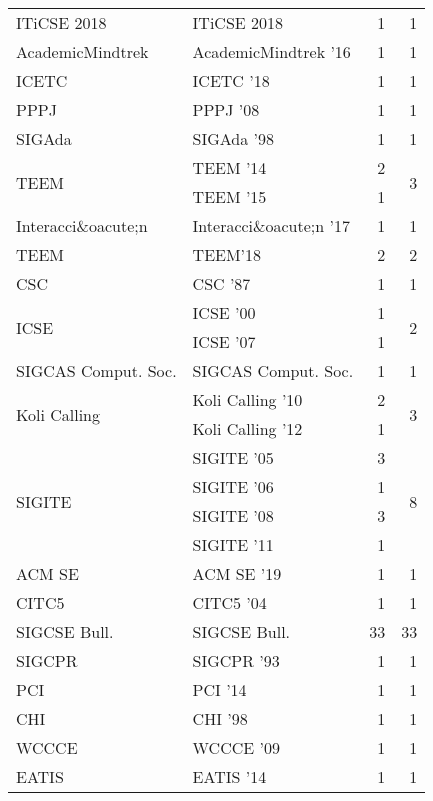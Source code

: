 \begin{table*}[t]
\begin{tabular}{llrr}
\multirow{1}{*}{ITiCSE 2018} & ITiCSE 2018 & 1 & \multirow{1}{*}{1}\\
\multirow{1}{*}{AcademicMindtrek } & AcademicMindtrek '16 & 1 & \multirow{1}{*}{1}\\
\multirow{1}{*}{ICETC } & ICETC '18 & 1 & \multirow{1}{*}{1}\\
\multirow{1}{*}{PPPJ } & PPPJ '08 & 1 & \multirow{1}{*}{1}\\
\multirow{1}{*}{SIGAda } & SIGAda '98 & 1 & \multirow{1}{*}{1}\\
\multirow{2}{*}{TEEM } & TEEM '14 & 2 & \multirow{2}{*}{3}\\
& TEEM '15 & 1 &\\
\multirow{1}{*}{Interacci\&oacute;n } & Interacci\&oacute;n '17 & 1 & \multirow{1}{*}{1}\\
\multirow{1}{*}{TEEM} & TEEM'18 & 2 & \multirow{1}{*}{2}\\
\multirow{1}{*}{CSC } & CSC '87 & 1 & \multirow{1}{*}{1}\\
\multirow{2}{*}{ICSE } & ICSE '00 & 1 & \multirow{2}{*}{2}\\
& ICSE '07 & 1 &\\
\multirow{1}{*}{SIGCAS Comput. Soc.} & SIGCAS Comput. Soc. & 1 & \multirow{1}{*}{1}\\
\multirow{2}{*}{Koli Calling } & Koli Calling '10 & 2 & \multirow{2}{*}{3}\\
& Koli Calling '12 & 1 &\\
\multirow{4}{*}{SIGITE } & SIGITE '05 & 3 & \multirow{4}{*}{8}\\
& SIGITE '06 & 1 &\\
& SIGITE '08 & 3 &\\
& SIGITE '11 & 1 &\\
\multirow{1}{*}{ACM SE } & ACM SE '19 & 1 & \multirow{1}{*}{1}\\
\multirow{1}{*}{CITC5 } & CITC5 '04 & 1 & \multirow{1}{*}{1}\\
\multirow{1}{*}{SIGCSE Bull.} & SIGCSE Bull. & 33 & \multirow{1}{*}{33}\\
\multirow{1}{*}{SIGCPR } & SIGCPR '93 & 1 & \multirow{1}{*}{1}\\
\multirow{1}{*}{PCI } & PCI '14 & 1 & \multirow{1}{*}{1}\\
\multirow{1}{*}{CHI } & CHI '98 & 1 & \multirow{1}{*}{1}\\
\multirow{1}{*}{WCCCE } & WCCCE '09 & 1 & \multirow{1}{*}{1}\\
\multirow{1}{*}{EATIS } & EATIS '14 & 1 & \multirow{1}{*}{1}\\

\end{tabular}
\end{table*}
